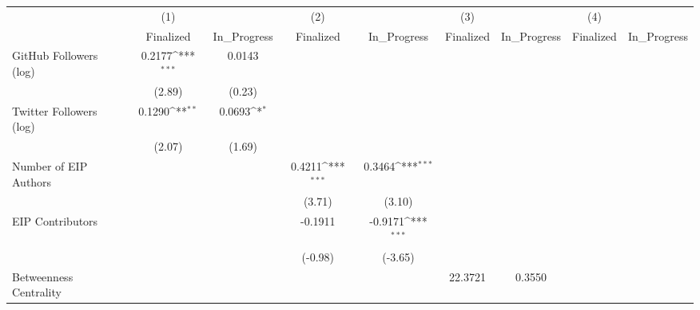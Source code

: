 {
\def\sym#1{\ifmmode^{#1}\else\(^{#1}\)\fi}
\begin{tabular}{l*{8}{c}}
\hline\hline
                                   &\multicolumn{1}{c}{(1)}         &                   &\multicolumn{1}{c}{(2)}         &                   &\multicolumn{1}{c}{(3)}         &                   &\multicolumn{1}{c}{(4)}         &                   \\
                                   & Finalized         &In\_Progress         & Finalized         &In\_Progress         & Finalized         &In\_Progress         & Finalized         &In\_Progress         \\
\hline
GitHub Followers (log)             &    0.2177\sym{***}&    0.0143         &                   &                   &                   &                   &                   &                   \\
                                   &    (2.89)         &    (0.23)         &                   &                   &                   &                   &                   &                   \\
[1em]
Twitter Followers (log)            &    0.1290\sym{**} &    0.0693\sym{*}  &                   &                   &                   &                   &                   &                   \\
                                   &    (2.07)         &    (1.69)         &                   &                   &                   &                   &                   &                   \\
[1em]
Number of EIP Authors              &                   &                   &    0.4211\sym{***}&    0.3464\sym{***}&                   &                   &                   &                   \\
                                   &                   &                   &    (3.71)         &    (3.10)         &                   &                   &                   &                   \\
[1em]
EIP Contributors                   &                   &                   &   -0.1911         &   -0.9171\sym{***}&                   &                   &                   &                   \\
                                   &                   &                   &   (-0.98)         &   (-3.65)         &                   &                   &                   &                   \\
[1em]
Betweenness Centrality             &                   &                   &                   &                   &   22.3721         &    0.3550         &                   &                   \\

\end{tabular}}
